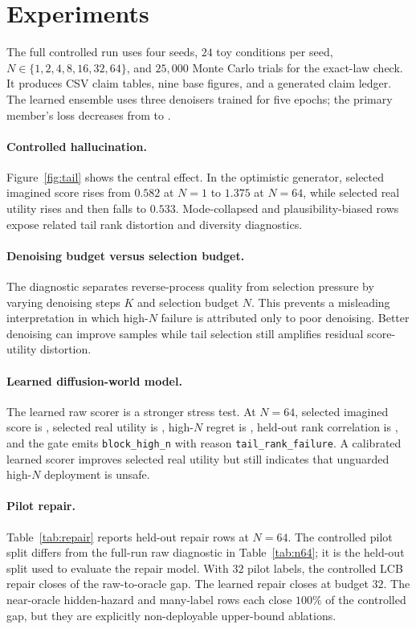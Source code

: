 \documentclass{article}
\begin{document}
\section{Experiments}

The full controlled run uses four seeds, $24$ toy conditions per seed, $N\in\{1,2,4,8,16,32,64\}$, and $25{,}000$ Monte Carlo trials for the exact-law check. It produces CSV claim tables, nine base figures, and a generated claim ledger. The learned ensemble uses three denoisers trained for five epochs; the primary member's loss decreases from \VFourDWMTrainingLossFirst{} to \VFourDWMTrainingLossLast{}.

\paragraph{Controlled hallucination.}
Figure~\ref{fig:tail} shows the central effect. In the optimistic generator, selected imagined score rises from $0.582$ at $N=1$ to $1.375$ at $N=64$, while selected real utility rises and then falls to $0.533$. Mode-collapsed and plausibility-biased rows expose related tail rank distortion and diversity diagnostics.

\paragraph{Denoising budget versus selection budget.}
The diagnostic separates reverse-process quality from selection pressure by varying denoising steps $K$ and selection budget $N$. This prevents a misleading interpretation in which high-$N$ failure is attributed only to poor denoising. Better denoising can improve samples while tail selection still amplifies residual score-utility distortion.

\paragraph{Learned diffusion-world model.}
The learned raw scorer is a stronger stress test. At $N=64$, selected imagined score is \VFourDWMLearnedRawImagined{}, selected real utility is \VFourDWMLearnedRawReal{}, high-$N$ regret is \VFourDWMLearnedRawRegret{}, held-out rank correlation is \VFourDWMLearnedHeldoutRankCorr{}, and the gate emits \texttt{block\_high\_n} with reason \texttt{tail\_rank\_failure}. A calibrated learned scorer improves selected real utility but still indicates that unguarded high-$N$ deployment is unsafe.

\paragraph{Pilot repair.}
Table~\ref{tab:repair} reports held-out repair rows at $N=64$. The controlled pilot split differs from the full-run raw diagnostic in Table~\ref{tab:n64}; it is the held-out split used to evaluate the repair model. With $32$ pilot labels, the controlled LCB repair closes \VFourDWMControlledGapBThirtyTwo{} of the raw-to-oracle gap. The learned repair closes \VFourDWMLearnedGapBThirtyTwo{} at budget $32$. The near-oracle hidden-hazard and many-label rows each close $100\%$ of the controlled gap, but they are explicitly non-deployable upper-bound ablations.
\end{document}
